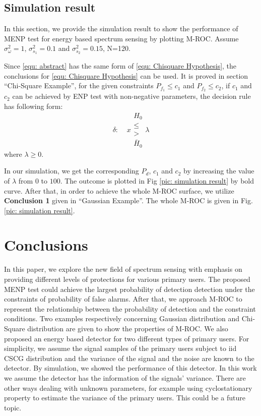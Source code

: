 \documentclass[12pt,journal,a4paper,twoside,onecolumn,draft]{IEEEtran}
\begin{document}
\begin{spacing}{2.5}
\subsection{Simulation result}
In this section, we provide the simulation result to show the performance of MENP test for energy based spectrum sensing by plotting M-ROC.  
Assume $\sigma_\omega^2 = 1$, $\sigma_{s_1}^2 = 0.1$ and $\sigma_{s_2}^2  = 0.15$, N=120.

Since \eqref{equ: abstract} has the same form of \eqref{equ: Chisquare Hypothesis}, the conclusions for \eqref{equ: Chisquare Hypothesis} can be used. 
It is proved in section ``Chi-Square Example'', for the given constraints $P_{f_1} \leq c_1$ and $P_{f_2} \leq c_2$, if $c_1$ and $c_2$ can be achieved by ENP test with non-negative parameters, the decision rule has following form:
\begin{equation}
\delta:\;\;\;\;x\substack{H_0 \\ \leq \\ > \\ \bar{H}_0} \lambda
\end{equation}
where $\lambda \geq 0$. 

In our simulation, we get the corresponding $P_d$, $c_1$ and $c_2$ by increasing the value of $\lambda$ from $0$ to $100$. The outcome is plotted in Fig \ref{pic: simulation result} by bold curve. 
After that, in order to achieve the whole M-ROC surface, we utilize \textbf{Conclusion 1} given in ``Gaussian Example''. The whole M-ROC is given in Fig. \ref{pic: simulation result}.

\section{Conclusions}
In this paper, we explore the new field of spectrum sensing with emphasis on providing different levels of protections for various primary users. 
The proposed MENP test could achieve the largest probability of detection detection under the constraints of probability of false alarms. 
After that, we approach M-ROC to represent the relationship between the probability of detection and the constraint conditions. Two examples respectively concerning Gaussian distribution and Chi-Square distribution are given to show the properties of M-ROC. 
We also proposed an energy based detector for two different types of primary users.
For simplicity, we assume the signal samples of the primary users subject to iid CSCG distribution and the variance of the signal and the noise are known to the detector.
By simulation, we showed the performance of this detector. 
In this work we assume the detector has the information of the signals' variance. There are other ways dealing with unknown parameters, for example using cyclostationary property to estimate the variance of the primary users. This could be a future topic.  


\end{spacing}
\end{document}
